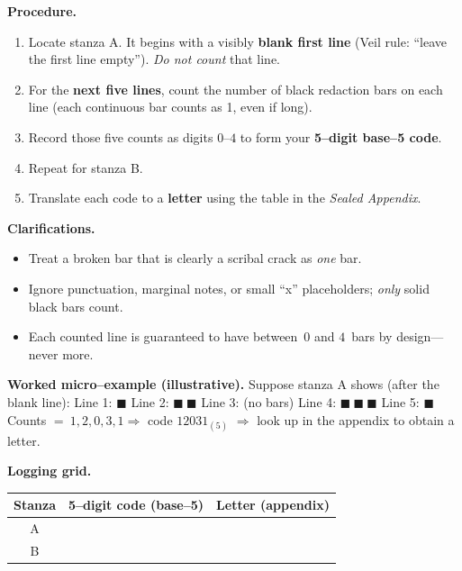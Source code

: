 \documentclass[11pt]{article}
\numberwithin{equation}{section} %
\theoremstyle{plain} %
\theoremstyle{definition} %
\theoremstyle{remark} %
\begin{document}
\medskip
\noindent\textbf{Procedure.}
\begin{enumerate}\setlength\itemsep{0.2em}
  \item Locate stanza \textsc{A}. It begins with a visibly \textbf{blank first line} (Veil rule: “leave the first line empty”). \emph{Do not count} that line.
  \item For the \textbf{next five lines}, count the number of black redaction bars on each line (each continuous bar counts as 1, even if long).
  \item Record those five counts as digits \(0\)–\(4\) to form your \textbf{5–digit base–5 code}.
  \item Repeat for stanza \textsc{B}.
  \item Translate each code to a \textbf{letter} using the table in the \emph{Sealed Appendix}.
\end{enumerate}

\medskip
\noindent\textbf{Clarifications.}
\begin{itemize}\setlength\itemsep{0.25em}
  \item Treat a broken bar that is clearly a scribal crack as \emph{one} bar.
  \item Ignore punctuation, marginal notes, or small “x” placeholders; \emph{only} solid black bars count.
  \item Each counted line is guaranteed to have between \(\,0\) and \(4\,\) bars by design—never more.
\end{itemize}

\medskip
\noindent\textbf{Worked micro–example (illustrative).}  
Suppose stanza \textsc{A} shows (after the blank line):  
Line 1: \(\blacksquare\) \quad Line 2: \(\blacksquare\ \blacksquare\) \quad Line 3: (no bars) \quad Line 4: \(\blacksquare\ \blacksquare\ \blacksquare\) \quad Line 5: \(\blacksquare\)  
Counts \(=\ 1,2,0,3,1 \Rightarrow\) code \(12031_{(5)}\) \(\Rightarrow\) look up in the appendix to obtain a letter.

\medskip
\noindent\textbf{Logging grid.}
\begin{center}
\begin{tabular}{c|c|c}
\textbf{Stanza} & \textbf{5–digit code (base–5)} & \textbf{Letter (appendix)} \\
\hline
A & \hspace{3.5cm} & \hspace{1.2cm} \\
B & \hspace{3.5cm} & \hspace{1.2cm} \\
\end{tabular}
\end{center}
\end{document}
